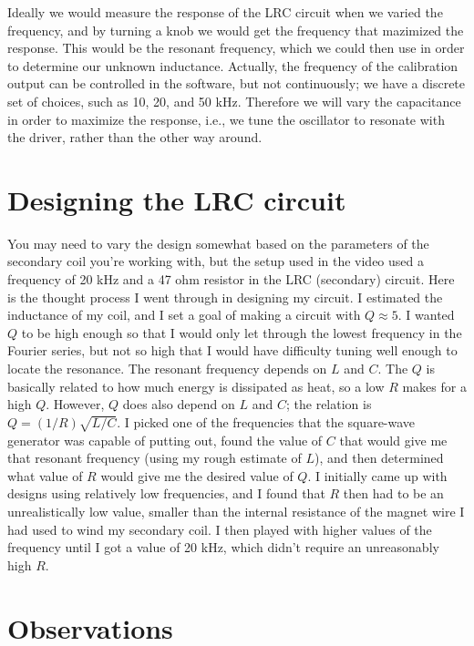 Ideally we would measure the response of the LRC circuit when we
varied the frequency, and by turning a knob we would get the frequency
that mazimized the response. This would be the resonant frequency,
which we could then use in order to determine our unknown inductance.
Actually, the frequency of the calibration output can be controlled in
the software, but not continuously; we have a discrete set of choices,
such as 10, 20, and 50 kHz. Therefore we will vary the capacitance in
order to maximize the response, i.e., we tune the oscillator to resonate
with the driver, rather than the other way around.

\section*{Designing the LRC circuit}

You may need to vary the design somewhat based on the parameters of the secondary coil you're
working with, but the setup used in the video used  a frequency of 20 kHz
and a 47 ohm resistor in the LRC (secondary) circuit. Here is the thought
process I went through in designing my circuit. I estimated the inductance
of my coil, and I set a goal of making a circuit with $Q\approx 5$.
I wanted $Q$ to be high enough so that I
would only let through the lowest frequency in the Fourier series, but
not so high that I would have difficulty tuning well enough to locate the
resonance.  The resonant frequency depends on $L$ and $C$. The $Q$ is
basically related to how much energy is dissipated as heat, so a low
$R$ makes for a high $Q$. However, $Q$ does also depend on $L$ and $C$;
the relation is $Q=(1/R)\sqrt{L/C}$. I picked one of the frequencies that
the square-wave generator was capable of putting out, found the value of
$C$ that would give me that resonant frequency (using my rough estimate of $L$),
and then determined what value of $R$ would give me the desired value of
$Q$. I initially came up with designs using relatively low frequencies, and I found that $R$
then had to be an unrealistically low value, smaller than the internal
resistance of the magnet wire I had used to wind my secondary coil.
I then played with higher values of the frequency until I got a value of 20 kHz,
which didn't require an unreasonably high $R$.

\section*{Observations}


